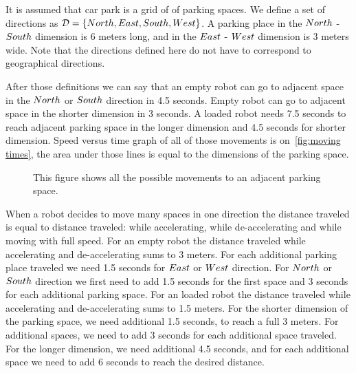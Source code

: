 It is assumed that car park is a grid of of parking spaces. We define a set of
directions as $\mathcal{D} = \{North, East, South, West\}$. A parking place in the $North$ -
$South$ dimension is 6 meters long, and in the $East$ - $West$ dimension is 3
meters wide. Note that the directions defined here do not have to correspond to
geographical directions.

After those definitions we can say that an empty robot can go to adjacent space
in the $North$ or $South$ direction in 4.5 seconds. Empty robot can go to adjacent
space in the shorter dimension in 3 seconds. A loaded robot needs 7.5 seconds
to reach adjacent parking space in the longer dimension and 4.5 seconds for
shorter dimension. Speed versus time graph of all of those movements is
on~\autoref{fig:moving times}, the area under those lines is equal to the
dimensions of the parking space.
\begin{figure}[h]
    \begin{center}
        
        \caption{This figure shows all the possible movements to an adjacent
        parking space.}
        \label{fig:moving times}
    \end{center}
\end{figure}

When a robot decides to move many spaces in one direction the distance traveled
is equal to distance traveled: while accelerating, while de-accelerating and
while moving with full speed. For an empty robot the distance traveled while
accelerating and de-accelerating sums to 3 meters. For each additional parking
place traveled we need 1.5 seconds for $East$ or $West$ direction. For $North$ or
$South$ direction we first need to add 1.5 seconds for the first space and 3
seconds for each additional parking space. For an loaded robot the distance traveled
while accelerating and de-accelerating sums to 1.5 meters. For the shorter
dimension of the parking space, we need additional 1.5 seconds, to reach a full 3
meters. For additional spaces, we need to add 3 seconds for each additional
space traveled. For the longer dimension, we need additional 4.5 seconds, and
for each additional space we need to add 6 seconds to reach the desired
distance.

